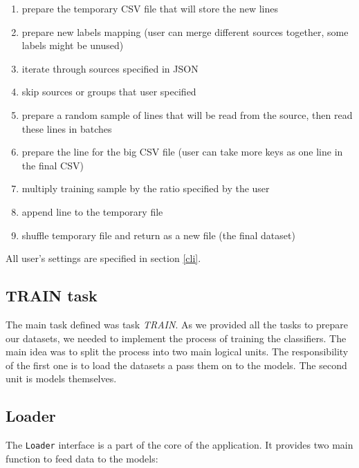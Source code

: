 \begin{enumerate}

\item prepare the temporary CSV file that will store the new lines

\item prepare new labels mapping (user can merge different sources together, some labels might be unused)

\item iterate through sources specified in JSON

\item skip sources or groups that user specified

\item prepare a random sample of lines that will be read from the source, then read these lines in batches

\item prepare the line for the big CSV file (user can take more keys as one line in the final CSV)

\item multiply training sample by the ratio specified by the user

\item append line to the temporary file

\item shuffle temporary file and return as a new file (the final dataset)

\end{enumerate}

\noindent
All user's settings are specified in section \ref{cli}.

\subsection{TRAIN task}

The main task defined was task \textit{TRAIN}. As we provided all the tasks to prepare our datasets, we needed to implement the process of training the classifiers. The main idea was to split the process into two main logical units. The responsibility of the first one is to load the datasets a pass them on to the models. The second unit is models themselves.

\subsection*{Loader}

The \texttt{Loader} interface is a part of the core of the application. It provides two main function to feed data to the models:

